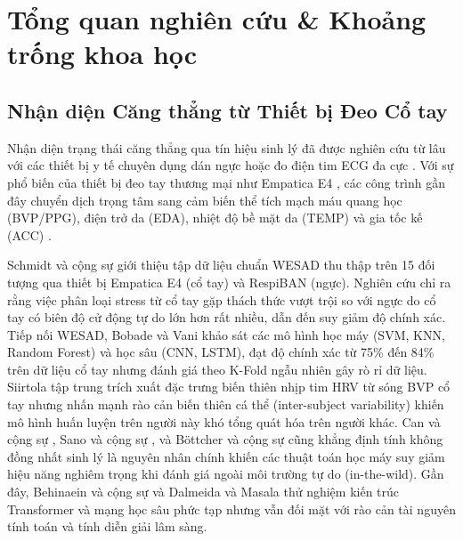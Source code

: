 \documentclass[conference]{IEEEtran}
\begin{document}
\section{Tổng quan nghiên cứu \& Khoảng trống khoa học}

\subsection{Nhận diện Căng thẳng từ Thiết bị Đeo Cổ tay}
Nhận diện trạng thái căng thẳng qua tín hiệu sinh lý đã được nghiên cứu từ lâu với các thiết bị y tế chuyên dụng dán ngực hoặc đo điện tim ECG đa cực \cite{taskforce1996heart}. Với sự phổ biến của thiết bị đeo tay thương mại như Empatica E4 \cite{garbarino2014empatica}, các công trình gần đây chuyển dịch trọng tâm sang cảm biến thể tích mạch máu quang học (BVP/PPG), điện trở da (EDA), nhiệt độ bề mặt da (TEMP) và gia tốc kế (ACC) \cite{can2019stress, gjoreski2016continuous}. 

Schmidt và cộng sự \cite{schmidt2018wesad} giới thiệu tập dữ liệu chuẩn WESAD thu thập trên 15 đối tượng qua thiết bị Empatica E4 (cổ tay) và RespiBAN (ngực). Nghiên cứu chỉ ra rằng việc phân loại stress từ cổ tay gặp thách thức vượt trội so với ngực do cổ tay có biên độ cử động tự do lớn hơn rất nhiều, dẫn đến suy giảm độ chính xác. Tiếp nối WESAD, Bobade và Vani \cite{bobade2020stress} khảo sát các mô hình học máy (SVM, KNN, Random Forest) và học sâu (CNN, LSTM), đạt độ chính xác từ 75\% đến 84\% trên dữ liệu cổ tay nhưng đánh giá theo K-Fold ngẫu nhiên gây rò rỉ dữ liệu. Siirtola \cite{siirtola2019continuous} tập trung trích xuất đặc trưng biến thiên nhịp tim HRV từ sóng BVP cổ tay nhưng nhấn mạnh rào cản biến thiên cá thể (inter-subject variability) khiến mô hình huấn luyện trên người này khó tổng quát hóa trên người khác. Can và cộng sự \cite{can2019stress}, Sano và cộng sự \cite{sano2018multimodal}, và Böttcher và cộng sự \cite{bottcher2023detection} cũng khẳng định tính không đồng nhất sinh lý là nguyên nhân chính khiến các thuật toán học máy suy giảm hiệu năng nghiêm trọng khi đánh giá ngoài môi trường tự do (in-the-wild). Gần đây, Behinaein và cộng sự \cite{behinaein2022transformer} và Dalmeida và Masala \cite{dalmeida2021computer} thử nghiệm kiến trúc Transformer và mạng học sâu phức tạp nhưng vẫn đối mặt với rào cản tài nguyên tính toán và tính diễn giải lâm sàng.
\end{document}
